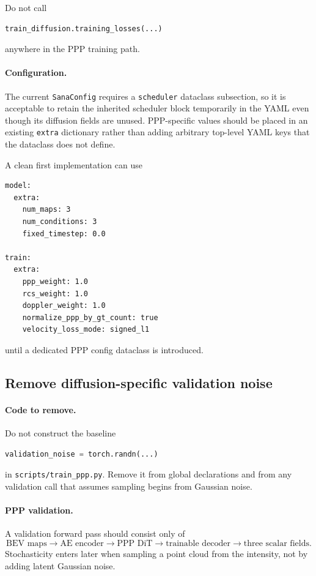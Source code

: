 \documentclass[11pt,a4paper]{article}
\begin{document}
Do not call
\begin{lstlisting}
train_diffusion.training_losses(...)
\end{lstlisting}
anywhere in the PPP training path.

\paragraph{Configuration.}
The current \texttt{SanaConfig} requires a \texttt{scheduler} dataclass subsection, so it is acceptable to retain the inherited scheduler block temporarily in the YAML even though its diffusion fields are unused. PPP-specific values should be placed in an existing \texttt{extra} dictionary rather than adding arbitrary top-level YAML keys that the dataclass does not define.

A clean first implementation can use
\begin{lstlisting}
model:
  extra:
    num_maps: 3
    num_conditions: 3
    fixed_timestep: 0.0

train:
  extra:
    ppp_weight: 1.0
    rcs_weight: 1.0
    doppler_weight: 1.0
    normalize_ppp_by_gt_count: true
    velocity_loss_mode: signed_l1
\end{lstlisting}
until a dedicated PPP config dataclass is introduced.

\subsection{Remove diffusion-specific validation noise}

\paragraph{Code to remove.}
Do not construct the baseline
\begin{lstlisting}[language=Python]
validation_noise = torch.randn(...)
\end{lstlisting}
in \texttt{scripts/train\_ppp.py}. Remove it from global declarations and from any validation call that assumes sampling begins from Gaussian noise.

\paragraph{PPP validation.}
A validation forward pass should consist only of
\[
    \text{BEV maps}
    \rightarrow
    \text{AE encoder}
    \rightarrow
    \text{PPP DiT}
    \rightarrow
    \text{trainable decoder}
    \rightarrow
    \text{three scalar fields}.
\]
Stochasticity enters later when sampling a point cloud from the intensity, not by adding latent Gaussian noise.
\end{document}
